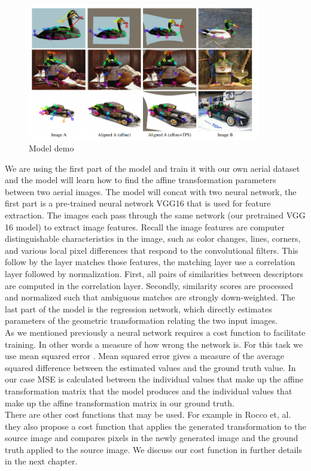 \begin{figure}
\centering
\includegraphics[width = 4.0in]{figs/keypoint_examples}
\caption{Model demo \cite{cnngeometric_pytorch}}
\end{figure}
  We are using the first part of the model and train it with our own aerial dataset and the model will learn how to find the affine transformation parameters between two aerial images. The model will concat with two neural network, the first part is a pre-trained neural network VGG16 that is used for feature extraction. The images each pass through the same network (our pretrained VGG 16 model) to extract image features. Recall the image features are computer distinguishable characteristics in the image, such as color changes, lines, corners, and various local pixel differences that respond to the convolutional filters. This follow by the layer matches those features, the matching layer use a correlation layer followed by normalization. First, all pairs of similarities
between descriptors are computed in the correlation layer. Secondly, similarity scores are processed and normalized such that ambiguous matches are strongly down-weighted\cite{Rocco17}.
The last part of the model is the regression network, which directly estimates parameters of the geometric transformation relating the two input images.\\
  As we mentioned previously a neural network requires a cost function to facilitate training. In other words a measure of how wrong the network is. For this task we use mean squared error \cite{mse}. Mean squared error gives a measure of the average squared difference between the estimated values and the ground truth value. In our case MSE is calculated between the individual values that make up the affine transformation matrix that the model produces and the individual values that make up the affine transformation matrix in our ground truth.\\
  There are other cost functions that may be used. For example in Rocco et, al. \cite{Rocco17} they also propose a cost function that applies the generated transformation to the source image and compares pixels in the newly generated image and the ground truth applied to the source image. We discuss our cost function in further details in the next chapter.
